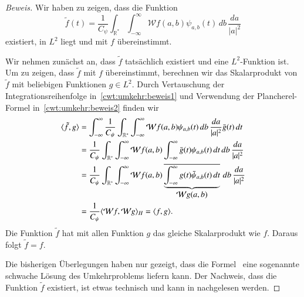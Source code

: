 \begin{proof}[Beweis]
Wir haben zu zeigen, dass die Funktion
\begin{equation}
\tilde{f}(t) = \frac{1}{C_{\psi}}\int_{\mathbb R^*}\int_{-\infty}^\infty
\mathcal{W}f(a,b) \psi_{a,b}(t)
\,db\,\frac{da}{|a|^2}
\end{equation}
existiert, in $L^2$ liegt  und mit $f$ übereinstimmt.

Wir nehmen zunächst an, dass $\tilde{f}$ tatsächlich existiert und eine
$L^2$-Funktion ist.
Um zu zeigen, dass $\tilde{f}$ mit $f$ übereinstimmt, berechnen wir das
Skalarprodukt von $\tilde{f}$ mit beliebigen Funktionen $g\in L^2$.
Durch Vertauschung der Integrationsreihenfolge in~\eqref{cwt:umkehr:beweis1}
und Verwendung der Plancherel-Formel in~\eqref{cwt:umkehr:beweis2}
finden wir
\begin{align}
\langle \tilde{f},g\rangle
&=
\int_{-\infty}^\infty
\frac1{C_{\psi}} \int_{\mathbb R^*}\int_{-\infty}^\infty
\mathcal{W}f(a,b)
\psi_{a,b}(t)
\,db\,\frac{da}{|a|^2}
\bar{g}(t)
\,dt
\notag
\\
&=
\frac1{C_{\psi}} \int_{\mathbb R^*}\int_{-\infty}^\infty
\mathcal{W}f(a,b)
\int_{-\infty}^\infty
\bar{g}(t)
\psi_{a,b}(t)
\,dt
\,db\,\frac{da}{|a|^2}
\label{cwt:umkehr:beweis1}
\\
&=
\frac1{C_{\psi}} \int_{\mathbb R^*}\int_{-\infty}^\infty
\mathcal{W}f(a,b)
\underbrace{
\overline{
\int_{-\infty}^\infty
g(t)
\bar{\psi}_{a,b}(t)
\,dt
}}_{\displaystyle\mathcal{W}g(a,b)}
\,db\,\frac{da}{|a|^2}
\notag
\\
&=
\frac{1}{C_{\psi}}
\langle \mathcal{W}f, \mathcal{W}g \rangle_H
=
\langle f, g\rangle.
\label{cwt:umkehr:beweis2}
\end{align}
Die Funktion $\tilde{f}$ hat mit allen Funktion $g$ das gleiche Skalarprodukt
wie $f$.
Daraus folgt $\tilde{f}=f$.

Die bisherigen Überlegungen haben nur gezeigt, dass die
Formel~\label{cwt:umkehr} eine sogenannte schwache Lösung des Umkehrproblems
liefern kann.
Der Nachweis, dass die Funktion $\tilde{f}$ existiert,
ist etwas technisch und kann
in \cite{buch:daubechies} nachgelesen werden.
\end{proof}



